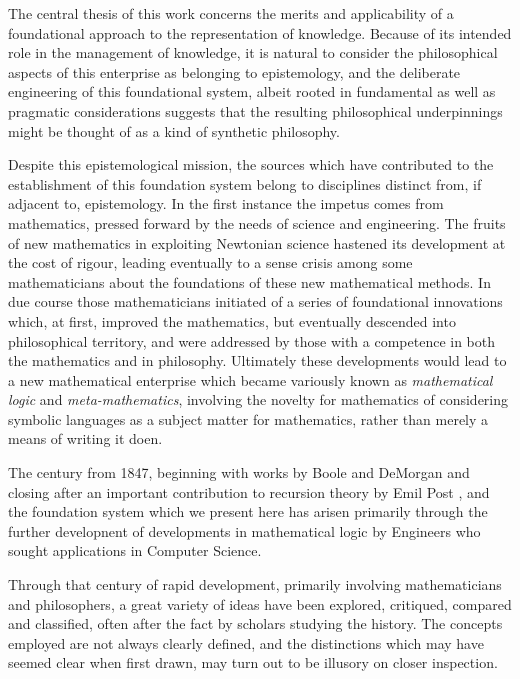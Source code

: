 The central thesis of this work concerns the merits and applicability of a foundational approach to the representation of knowledge.
Because of its intended role in the management of knowledge, it is natural to consider the philosophical aspects of this enterprise as belonging to epistemology, and the deliberate engineering of this foundational system, albeit rooted in fundamental as well as pragmatic considerations suggests that the resulting philosophical underpinnings might be thought of as a kind of synthetic philosophy.

Despite this epistemological mission, the sources which have contributed to the establishment of this foundation system belong to disciplines distinct from, if adjacent to, epistemology.
In the first instance the impetus comes from mathematics, pressed forward by the needs of science and engineering.
The fruits of new mathematics in exploiting Newtonian science hastened its development at the cost of rigour, leading eventually to a sense crisis among some mathematicians about the foundations of these new mathematical methods.
In due course those mathematicians initiated of a series of foundational innovations which, at first, improved the mathematics, but eventually descended into philosophical territory, and were addressed by those with a competence in both the mathematics and in philosophy.
Ultimately these developments would lead to a new mathematical enterprise which became variously known as \emph{mathematical logic} and \emph{meta-mathematics}, involving the novelty for mathematics of considering symbolic languages as a subject matter for mathematics, rather than merely a means of writing it doen.

The century from 1847, beginning with works by Boole \cite{boole1847mathematical} and DeMorgan \cite{demorgan1847formal} and closing after an important contribution to recursion theory by Emil Post \cite{post1944recursively}, and the foundation system which we present here has arisen primarily through the further developnent of developments in mathematical logic by Engineers who sought applications in Computer Science.

Through that century of rapid development, primarily involving mathematicians and philosophers, a great variety of ideas have been explored, critiqued, compared and classified, often after the fact by scholars studying the history.
The concepts employed are not always clearly defined, and the distinctions which may have seemed clear when first drawn, may turn out to be illusory on closer inspection.

